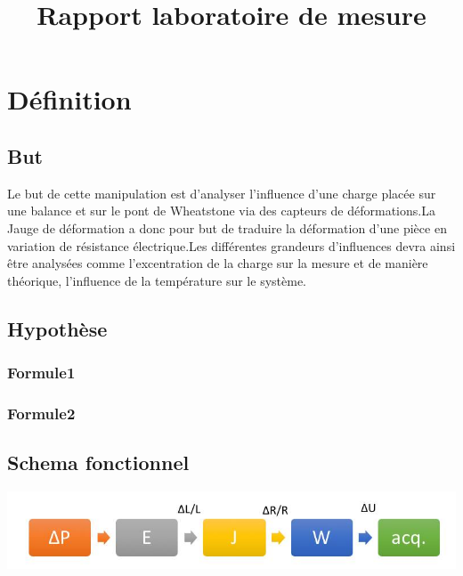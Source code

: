 \documentclass[11pt,a4paper]{report}
\begin{document}
\title{Rapport laboratoire de mesure}
\section*{Définition}	
\subsection*{But}

Le but de cette manipulation est d'analyser l'influence d'une charge placée sur une balance et sur le pont de Wheatstone via des capteurs de déformations.La Jauge de déformation a donc pour but de traduire la déformation d'une pièce en variation de résistance électrique.Les différentes grandeurs d'influences devra ainsi être analysées comme l'excentration de la charge sur la mesure et de manière théorique, l'influence de la température sur le système.
\subsection*{Hypothèse}

\subsubsection*{Formule1}
\subsubsection*{Formule2}
\subsection*{Schema fonctionnel}
\begin{center}
\includegraphics[scale=0.5]{image1.jpg} 
\end{center}
\end{document}
